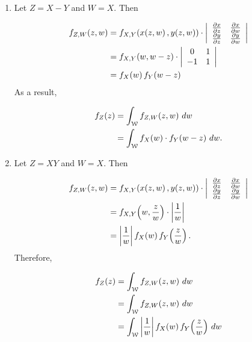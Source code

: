 \documentclass[12pt,letterpaper,reqno]{amsart}
\numberwithin{equation}{subsection}
\begin{document}
\begin{enumerate}[label=(\alph*),leftmargin=*]

\item Let $Z = X-Y$ and $W = X$. Then

\begin{align*}
    \fun{f_{Z,W}}{z,w} &= \fun{f_{X,Y}}{\fun{x}{z,w}, \fun{y}{z,w}} \cdot \left\vert \begin{array}{cc}
         \dif{x}{z} & \dif{x}{w} \\
         \dif{y}{z} & \dif{y}{w}
    \end{array} \right\vert \\
    &= \fun{f_{X,Y}}{w, w-z} \cdot \left\vert \begin{array}{cc}
         0 & 1 \\
         -1 & 1
    \end{array} \right\vert \\
    &= \fun{f_X}{w} \fun{f_Y}{w-z}
\end{align*}
As a result,

\begin{align*}
    \fun{f_Z}{z} &= \myint{\fun{f_{Z,W}}{z,w}}{w}{\mycal{W}}{} \\
    &= \myint{\fun{f_X}{w} \cdot \fun{f_Y}{w-z}}{w}{\mycal{W}}{}.
\end{align*}

\item Let $Z = XY$ and $W = X$. Then

\begin{align*}
    \fun{f_{Z,W}}{z,w} &= \fun{f_{X,Y}}{\fun{x}{z,w}, \fun{y}{z,w}} \cdot \left\vert \begin{array}{cc}
         \dif{x}{z} & \dif{x}{w} \\
         \dif{y}{z} & \dif{y}{w}
    \end{array} \right\vert \\
    &= \fun{f_{X,Y}}{w, \frac{z}{w}} \cdot \Abs{\frac{1}{w}} \\
    &= \Abs{\frac{1}{w}} \fun{f_X}{w} \fun{f_Y}{\frac{z}{w}}.
\end{align*}
Therefore,

\begin{align*}
    \fun{f_Z}{z} &= \myint{\fun{f_{Z,W}}{z,w}}{w}{\mycal{W}}{} \\
    &= \myint{\fun{f_{Z,W}}{z,w}}{w}{\mycal{W}}{} \\
    &= \myint{\Abs{\frac{1}{w}} \fun{f_X}{w} \fun{f_Y}{\frac{z}{w}}}{w}{\mycal{W}}{}
\end{align*}


\end{enumerate}
\end{document}
